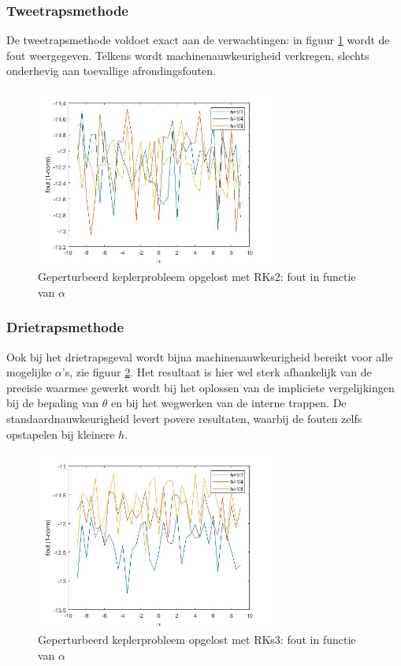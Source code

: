 \documentclass[12pt]{article}
\begin{document}
\subsubsection{Tweetrapsmethode}
De tweetrapsmethode voldoet exact aan de verwachtingen: in figuur \ref{fig:pertkepleralphasrks2} wordt de fout weergegeven. Telkens wordt machinenauwkeurigheid verkregen, slechts onderhevig aan toevallige afrondingsfouten.
\begin{figure}[H]
    \centering
    \includegraphics[width=0.7\textwidth]{pert_kepler_RKs2.jpg}
    \caption{Geperturbeerd keplerprobleem opgelost met RKs2: fout in functie van \(\alpha\)}
    \label{fig:pertkepleralphasrks2}
\end{figure}

\subsubsection{Drietrapsmethode}
Ook bij het drietrapsgeval wordt bijna machinenauwkeurigheid bereikt voor alle mogelijke \(\alpha\)'s, zie figuur \ref{fig:pertkepleralphasrks3}. Het resultaat is hier wel sterk afhankelijk van de precisie waarmee gewerkt wordt bij het oplossen van de impliciete vergelijkingen bij de bepaling van \(\theta\) en bij het wegwerken van de interne trappen. De standaardnauwkeurigheid levert povere resultaten, waarbij de fouten zelfs opstapelen bij kleinere \(h\).
\begin{figure}[H]
    \centering
    \includegraphics[width=0.7\textwidth]{pert_kepler_RKs3.jpg}
    \caption{Geperturbeerd keplerprobleem opgelost met RKs3: fout in functie van \(\alpha\)}
    \label{fig:pertkepleralphasrks3}
\end{figure}
\end{document}
